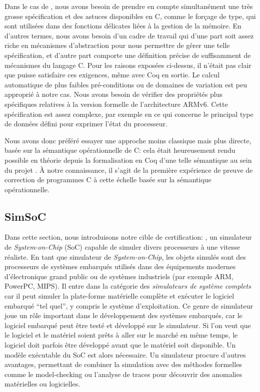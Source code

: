 Dans le cas de \simsoc, nous avons besoin de prendre en compte
simultanément une très grosse spécification et des astuces disponibles en C,
comme le forçage de type, qui sont utilisées dans des fonctions
délicates liées à la gestion de la mémoire.
En d'autres termes, nous avons besoin d'un cadre de travail
qui d'une part soit assez riche en mécanismes d'abstraction
pour nous permettre de gérer une telle spécification,
et d'autre part comporte une définition précise de suffisamment
de mécanismes du langage C.
Pour les raisons exposées ci-dessus, il n'était pas clair que \framac
puisse satisfaire ces exigences, même avec Coq en sortie.
Le calcul automatique de plus faibles pré-conditions ou de domaines
de variation est peu approprié à notre cas.
Nous avons besoin de vérifier des propriétés plus spécifiques
relatives à la version formelle de l'architecture ARMv6.
Cette spécification est assez complexe, par exemple en ce qui concerne
le principal type de données défini pour exprimer l'état du processeur.

Nous avons donc préféré essayer une approche
moins classique mais plus directe,
basée sur la sémantique opérationnelle de C:
cela était heureusement rendu possible en théorie depuis la formalisation
en Coq d'une telle sémantique au sein du projet \compcert.
À notre connaissance,
il s'agit de la première expérience de preuve de correction
de programmes C à cette échelle basée sur la sémantique opérationnelle.

\subsection*{SimSoC}

Dans cette section, nous introduisons notre cible de certification:
\simsoc, un simulateur de \emph{System-on-Chip} (SoC) capable de simuler 
divers processeurs à une vitesse réaliste.
En tant que  simulateur de \emph{System-on-Chip}, les objets simulés
sont des processeurs de systèmes embarqués utilisés dans des équipements
modernes d'électronique grand public ou de systèmes industriels
(par exemple ARM, PowerPC, MIPS).
Il entre dans la catégorie des \emph{simulateurs de système complets}
car il peut simuler la plate-forme matérielle complète et exécuter
le logiciel embarqué ``tel quel'', y compris le système d'exploitation.
Ce genre de simulateur joue un rôle important dans le développement
des systèmes embarqués,
car le logiciel embarqué peut être testé et développé sur le simulateur.
Si l'on veut que le logiciel et le matériel soient prêts à aller sur
le marché en même temps, le logiciel doit parfois
être développé avant que le matériel soit disponible.
Un modèle exécutable du SoC est alors nécessaire.
Un simulateur procure d'autres avantages, permettant de combiner
la simulation avec des méthodes formelles comme le model-checking
ou l'analyse de traces pour découvrir des anomalies matérielles ou logicielles.

